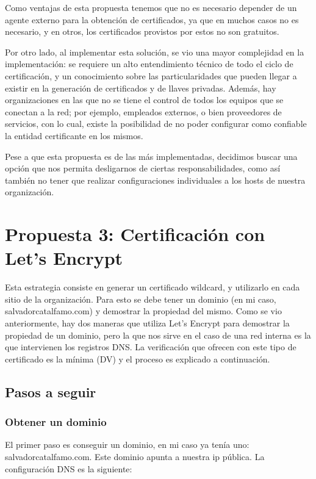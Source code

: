 Como ventajas de esta propuesta tenemos que no es necesario depender de un 
agente externo para la obtención de certificados, ya que en muchos casos 
no es necesario, y en otros, los certificados provistos por estos no son 
gratuitos. 

Por otro lado, al implementar esta solución, se vio una mayor complejidad 
en la implementación: se requiere un alto entendimiento técnico de todo el 
ciclo de certificación, y un conocimiento sobre las particularidades que 
pueden llegar a existir en la generación de certificados y de llaves privadas. 
Además, hay organizaciones en las que no se tiene el control de todos 
los equipos que se conectan a la red; por ejemplo, empleados externos, 
o bien proveedores de servicios, con lo cual, existe la posibilidad de no 
poder configurar como confiable la entidad certificante en los 
mismos.

Pese a que esta propuesta es de las más implementadas, decidimos buscar 
una opción que nos permita desligarnos de ciertas responsabilidades, 
como así también no tener que realizar configuraciones individuales 
a los hosts de nuestra organización.

\section{Propuesta 3: Certificación con Let's Encrypt}
Esta estrategia consiste en generar un certificado wildcard, y utilizarlo en cada sitio de la organización.
Para esto se debe tener un dominio (en mi caso, salvadorcatalfamo.com) y demostrar la propiedad 
del mismo. Como se vio anteriormente, hay dos maneras que utiliza Let's Encrypt para demostrar la propiedad 
de un dominio, pero la que nos sirve en el caso de una red interna es la que intervienen los registros DNS. 
La verificación que ofrecen con este tipo de certificado es la mínima (DV) y el proceso es explicado a 
continuación.


\subsection{Pasos a seguir}
\subsubsection*{Obtener un dominio}
El primer paso es conseguir un dominio, en mi caso ya tenía uno:
salvadorcatalfamo.com. Este dominio apunta a nuestra ip pública. La configuración DNS
es la siguiente:  


